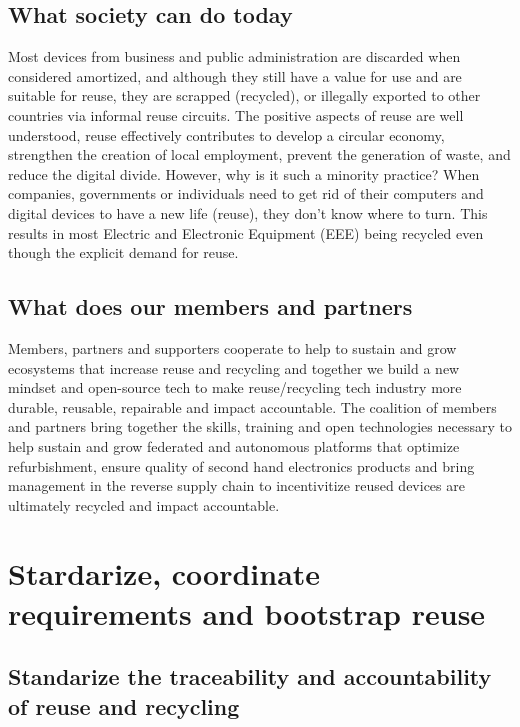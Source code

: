 \documentclass[
]{book}
\begin{document}
\hypertarget{what-society-can-do-today}{%
\subsection{What society can do today}\label{what-society-can-do-today}}

Most devices from business and public administration are discarded when considered amortized, and although they still have a value for use and are suitable for reuse, they are scrapped (recycled), or illegally exported to other countries via informal reuse circuits. The positive aspects of reuse are well understood, reuse effectively contributes to develop a circular economy, strengthen the creation of local employment, prevent the generation of waste, and reduce the digital divide. However, why is it such a minority practice? When companies, governments or individuals need to get rid of their computers and digital devices to have a new life (reuse), they don't know where to turn. This results in most Electric and Electronic Equipment (EEE) being recycled even though the explicit demand for reuse.

\hypertarget{what-does-our-members-and-partners}{%
\subsection{What does our members and partners}\label{what-does-our-members-and-partners}}

Members, partners and supporters cooperate to help to sustain and grow ecosystems that increase reuse and recycling and together we build a new mindset and open-source tech to make reuse/recycling tech industry more durable, reusable, repairable and impact accountable. The coalition of members and partners bring together the skills, training and open technologies necessary to help sustain and grow federated and autonomous platforms that optimize refurbishment, ensure quality of second hand electronics products and bring management in the reverse supply chain to incentivitize reused devices are ultimately recycled and impact accountable.

\hypertarget{stardarize-coordinate-requirements-and-bootstrap-reuse}{%
\section{Stardarize, coordinate requirements and bootstrap reuse}\label{stardarize-coordinate-requirements-and-bootstrap-reuse}}

\hypertarget{standarize-the-traceability-and-accountability-of-reuse-and-recycling}{%
\subsection{Standarize the traceability and accountability of reuse and recycling}\label{standarize-the-traceability-and-accountability-of-reuse-and-recycling}}
\end{document}

